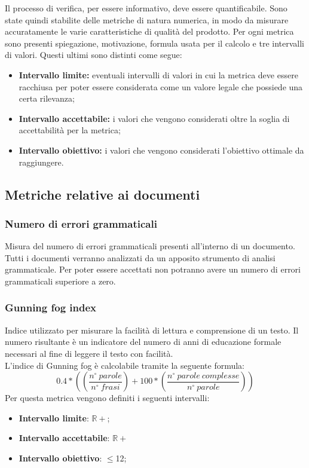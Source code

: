 Il processo di verifica, per essere informativo, deve essere quantificabile. Sono state quindi stabilite delle metriche di natura numerica, in modo da misurare accuratamente le varie caratteristiche di qualità del prodotto. Per ogni metrica sono presenti  spiegazione, motivazione, formula usata per il calcolo e tre intervalli di valori. Questi ultimi sono distinti come segue:
\begin{itemize}
	\item {\textbf{Intervallo limite:} eventuali intervalli di valori in cui la metrica deve essere racchiusa per poter essere considerata come un valore legale che possiede una certa rilevanza;}
	\item {\textbf{Intervallo accettabile:} i valori che vengono considerati oltre la soglia di accettabilità per la metrica;}
	\item {\textbf{Intervallo obiettivo:} i valori che vengono considerati l'obiettivo ottimale da raggiungere.}
\end{itemize}

\subsection{Metriche relative ai documenti}
\subsubsection{Numero di errori grammaticali}
Misura del numero di errori grammaticali presenti all'interno di un documento.
Tutti i documenti verranno analizzati da un apposito strumento di analisi grammaticale. Per poter essere accettati non potranno avere un numero di errori grammaticali superiore a zero.

\subsubsection{Gunning fog index}
Indice utilizzato per misurare la facilità di lettura e comprensione di un testo. Il numero risultante è un indicatore del numero di anni di educazione formale necessari al fine di leggere il testo con facilità. \\
L'indice di Gunning fog è calcolabile tramite la seguente formula:
$$
	0.4*((\frac{n^{\circ}\:parole}{n^{\circ}\:frasi})+100*(\frac{n^{\circ}\:parole\:complesse}{n^{\circ}\:parole}))
$$
Per questa metrica vengono definiti i seguenti intervalli: 
\begin{itemize}
	\item{\textbf{Intervallo limite}: $\mathbb{R+}$;}
	\item{\textbf{Intervallo accettabile}: $\mathbb{R+}$}
	\item{\textbf{Intervallo obiettivo}: $\leq$12;}
\end{itemize}

